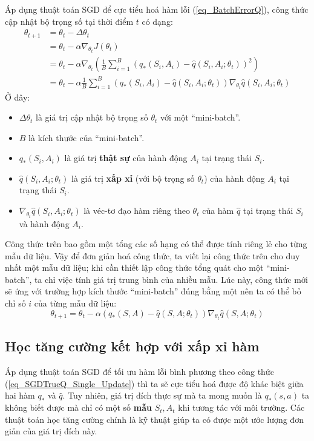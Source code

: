 	Áp dụng thuật toán SGD để cực tiểu hoá hàm lỗi (\ref{eq_BatchErrorQ}), công thức cập nhật bộ trọng số tại thời điểm $t$ có dạng:
	\begin{align}
		\theta_{t + 1} &= \theta_t - \Delta \theta_t \nonumber \\
		&= \theta_t - \alpha \nabla_{\theta_t} J(\theta_t) \nonumber \\
		&= \theta_t - \alpha \nabla_{\theta_t} \left( \frac{1}{B} \sum_{i = 1}^{B}(q_{*}(S_i,A_i) - \hat{q}(S_i,A_i;\theta_t))^2 \right) \nonumber\\
		\label{eq_SGDTrueQ_Update}
		&= \theta_t - \alpha \frac{1}{B} \sum_{i = 1}^{B}(q_{*}(S_i,A_i) - \hat{q}(S_i,A_i;\theta_t)) \nabla_{\theta_t} \hat{q}(S_i, A_i;\theta_t)
	\end{align}
	Ở đây:
	\begin{itemize}
		\item $\Delta \theta_t$ là giá trị cập nhật bộ trọng số $\theta_t$ với một ``mini-batch''.
		\item $B$ là kích thước của ``mini-batch''.
		\item $q_{*}(S_i,A_i)$ là giá trị \textbf{thật sự} của hành động $A_i$ tại trạng thái $S_i$.
		\item $\hat{q}(S_i,A_i;\theta_t)$ là giá trị \textbf{xấp xỉ} (với bộ trọng số $\theta_t$) của hành động $A_i$ tại trạng thái $S_i$.
		\item $\nabla_{\theta_t} \hat{q}(S_i, A_i;\theta_t)$ là véc-tơ đạo hàm riêng theo $\theta_t$ của hàm $\hat{q}$ tại trạng thái $S_i$ và hành động $A_i$.
	\end{itemize}
	Công thức trên bao gồm một tổng các số hạng có thể được tính riêng lẻ cho từng mẫu dữ liệu.
	Vậy để đơn giản hoá công thức, ta viết lại công thức trên cho duy nhất một mẫu dữ liệu; khi cần thiết lập công thức tổng quát cho một ``mini-batch'', ta chỉ việc tính giá trị trung bình của nhiều mẫu.
	Lúc này, công thức mới sẽ ứng với trường hợp kích thước ``mini-batch'' đúng bằng một nên ta có thể bỏ chỉ số $i$ của từng mẫu dữ liệu:
	\begin{equation}
		\label{eq_SGDTrueQ_Single_Update}
		\theta_{t+1} = \theta_t - \alpha (q_{*}(S,A) - \hat{q}(S,A;\theta_t)) \nabla_{\theta_t} \hat{q}(S, A;\theta_t)
	\end{equation}
	
\subsection{Học tăng cường kết hợp với xấp xỉ hàm}
	Áp dụng thuật toán SGD để tối ưu hàm lỗi bình phương theo công thức (\ref{eq_SGDTrueQ_Single_Update}) thì ta sẽ cực tiểu hoá được độ khác biệt giữa hai hàm $q_{*}$ và $\hat{q}$.
	Tuy nhiên, giá trị đích thực sự mà ta mong muốn là $q_{*}(s,a)$ ta không biết được mà chỉ có một số \textbf{mẫu} $S_t, A_t$ khi tương tác với môi trường.
	Các thuật toán học tăng cường chính là kỹ thuật giúp ta có được một ước lượng đơn giản của giá trị đích này.
	
